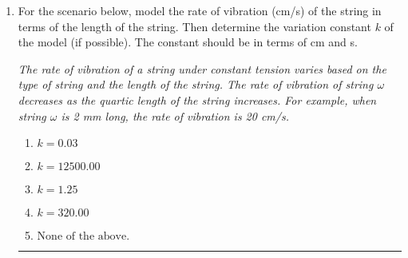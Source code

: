 \documentclass[14pt]{extbook}
\newcommand{\litem}[1]{\item#1\hspace*{-1cm}\rule{\textwidth}{0.4pt}}
\begin{document}
\begin{enumerate}
{\begin{enumerate}[label=\Alph*.]
\end{enumerate} }
\litem{
For the scenario below, model the rate of vibration (cm/s) of the string in terms of the length of the string. Then determine the variation constant $k$ of the model (if possible). The constant should be in terms of cm and s.
\begin{center}
    \textit{ The rate of vibration of a string under constant tension varies based on the type of string and the length of the string. The rate of vibration of string $\omega$ decreases as the quartic length of the string increases. For example, when string $\omega$ is 2 mm long, the rate of vibration is 20 cm/s. }
\end{center}
\begin{enumerate}[label=\Alph*.]
\item \( k = 0.03 \)
\item \( k = 12500.00 \)
\item \( k = 1.25 \)
\item \( k = 320.00 \)
\item \( \text{None of the above.} \)

\end{enumerate} }
\end{enumerate}
\end{document}
